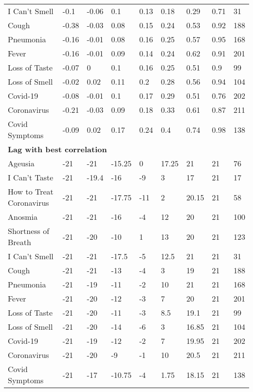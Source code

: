 \begin{tabular}{l llllllll}
I Can't Smell & -0.1 & -0.06 & 0.1 & 0.13 & 0.18 & 0.29 & 0.71 & 31  \\ 
Cough & -0.38 & -0.03 & 0.08 & 0.15 & 0.24 & 0.53 & 0.92 & 188  \\ 
Pneumonia & -0.16 & -0.01 & 0.08 & 0.16 & 0.25 & 0.57 & 0.95 & 168  \\ 
Fever & -0.16 & -0.01 & 0.09 & 0.14 & 0.24 & 0.62 & 0.91 & 201  \\ 
Loss of Taste & -0.07 & 0 & 0.1 & 0.16 & 0.25 & 0.51 & 0.9 & 99  \\ 
Loss of Smell & -0.02 & 0.02 & 0.11 & 0.2 & 0.28 & 0.56 & 0.94 & 104  \\ 
Covid-19 & -0.08 & -0.01 & 0.1 & 0.17 & 0.29 & 0.51 & 0.76 & 202  \\ 
Coronavirus & -0.21 & -0.03 & 0.09 & 0.18 & 0.33 & 0.61 & 0.87 & 211  \\ 
Covid Symptoms & -0.09 & 0.02 & 0.17 & 0.24 & 0.4 & 0.74 & 0.98 & 138  \\ 
\hline 
\multicolumn{9}{l}{{\bf Lag with best correlation}}  \\ 
Ageusia & -21 & -21 & -15.25 & 0 & 17.25 & 21 & 21 & 76  \\ 
I Can't Taste & -21 & -19.4 & -16 & -9 & 3 & 17 & 21 & 17  \\ 
How to Treat Coronavirus & -21 & -21 & -17.75 & -11 & 2 & 20.15 & 21 & 58  \\ 
Anosmia & -21 & -21 & -16 & -4 & 12 & 20 & 21 & 100  \\ 
Shortness of Breath & -21 & -20 & -10 & 1 & 13 & 20 & 21 & 123  \\ 
I Can't Smell & -21 & -21 & -17.5 & -5 & 12.5 & 21 & 21 & 31  \\ 
Cough & -21 & -21 & -13 & -4 & 3 & 19 & 21 & 188  \\ 
Pneumonia & -21 & -19 & -11 & -2 & 10 & 21 & 21 & 168  \\ 
Fever & -21 & -20 & -12 & -3 & 7 & 20 & 21 & 201  \\ 
Loss of Taste & -21 & -20 & -11 & -3 & 8.5 & 19.1 & 21 & 99  \\ 
Loss of Smell & -21 & -20 & -14 & -6 & 3 & 16.85 & 21 & 104  \\ 
Covid-19 & -21 & -19 & -12 & -2 & 7 & 19.95 & 21 & 202  \\ 
Coronavirus & -21 & -20 & -9 & -1 & 10 & 20.5 & 21 & 211  \\ 
Covid Symptoms & -21 & -17 & -10.75 & -4 & 1.75 & 18.15 & 21 & 138  \\ 
\hline 
\end{tabular} 